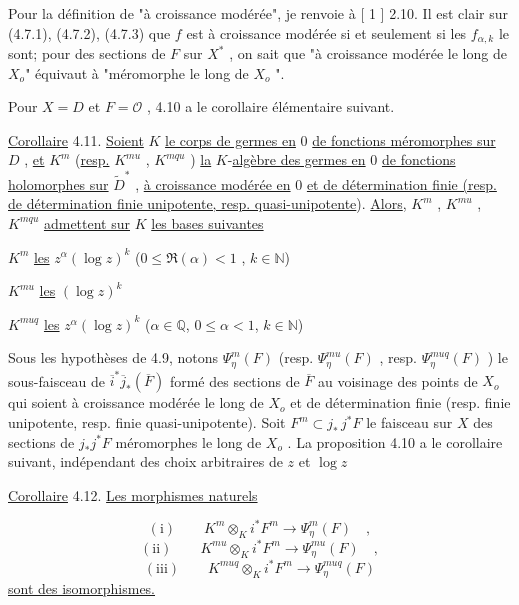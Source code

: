 Pour la définition de "à croissance modérée", je renvoie à [ 1 ] 2.10. Il est clair sur (4.7.1), (4.7.2), (4.7.3) que $f$ est à croissance modérée si et seulement si les $f_{\alpha,k}$ le sont; pour des sections de $F$ sur $X^*$ , on sait
que "à croissance modérée le long de $X_o$" équivaut à "méromorphe le long de $X_o$ ".

Pour $X = D$ et $F = \mathcal{O}$ , 4.10 a le corollaire élémentaire suivant.

\underline{Corollaire} 4.11. \underline{Soient} $K$ \underline{le corps de germes en} $0$ \underline{de fonctions méromorphes sur} $D$ , \underline{et} $K^m$ (\underline{resp.} $K^{mu}$ , $K^{mqu}$ ) \underline{la} $K$-\underline{algèbre des germes en} $0$ \underline{de fonctions holomorphes sur} $\widetilde{D}^*$ , \underline{à croissance modérée en} $0$ \underline{et de détermination finie (resp. de détermination finie unipotente, resp. quasi-unipotente}). \underline{Alors}, $K^m$ , $K^{mu}$ , $K^{mqu}$ \underline{admettent sur} $K$ \underline{les bases suivantes}

$K^m$ \qquad \underline{les} \quad $z^\alpha (\log z)^k$ \qquad\qquad\qquad ($0 \leq \Re(\alpha) < 1$ , $k \in \mathbb{N}$)

$K^{mu}$ \qquad \underline{les} \quad $(\log z)^k$

$K^{muq}$ \qquad \underline{les} \quad $z^\alpha (\log z)^k$ \qquad\qquad\qquad ($\alpha \in \mathbb{Q}$, $0 \leq \alpha < 1$, $k \in \mathbb{N}$)

Sous les hypothèses de 4.9, notons $\Psi^m_\eta(F)$ (resp. $\Psi^{mu}_\eta(F)$ , resp. $\Psi^{muq}_\eta(F)$ ) le sous-faisceau de $\overline{i}^* \overline{j}_*(\overline{F})$ formé des sections de $\overline{F}$ au voisinage des points de $X_o$ qui soient à croissance modérée le long de $X_o$ et de détermination finie (resp. finie unipotente, resp. finie quasi-unipotente). Soit $F^m \subset j_* \, j^* F$ le faisceau sur $X$ des sections de $j_* j^* F$ méromorphes le long de $X_o$ . La proposition 4.10 a le corollaire suivant, indépendant des choix arbitraires de $z$ et $\log z$

\underline{Corollaire} 4.12. \underline{Les morphismes naturels}

\begin{equation*}
\mathrm{(i)} \qquad K^m \otimes_K i^* F^m \longrightarrow \Psi^m_\eta(F) \quad ,
\end{equation*}
\begin{equation*}
\mathrm{(ii)} \qquad K^{mu} \otimes_K i^* F^m \longrightarrow \Psi^{mu}_\eta(F) \quad ,
\end{equation*}
\begin{equation*}
\mathrm{(iii)} \qquad K^{muq} \otimes_K i^* F^m \longrightarrow \Psi^{muq}_\eta(F)
\end{equation*}
\underline{sont des isomorphismes.}

